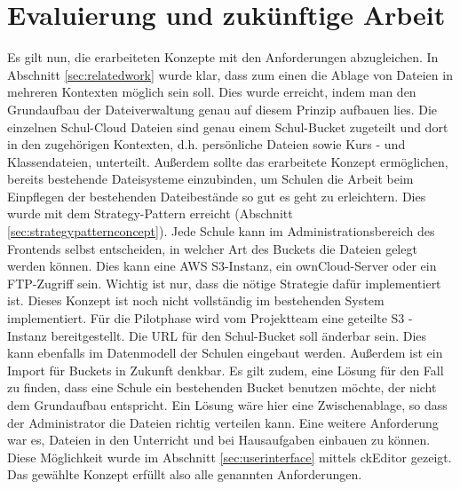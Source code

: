 \section{Evaluierung und zukünftige Arbeit}
\label{sec:evaluation}

Es gilt nun, die erarbeiteten Konzepte mit den Anforderungen abzugleichen. In Abschnitt \ref{sec:relatedwork} wurde klar, dass zum einen die Ablage von Dateien in mehreren Kontexten möglich sein soll. Dies wurde erreicht, indem man den Grundaufbau der Dateiverwaltung genau auf diesem Prinzip aufbauen lies. Die einzelnen Schul-Cloud Dateien sind genau einem Schul-Bucket zugeteilt und dort in den zugehörigen Kontexten, d.h. persönliche Dateien sowie Kurs - und Klassendateien, unterteilt. Außerdem sollte das erarbeitete Konzept ermöglichen, bereits bestehende Dateisysteme einzubinden, um Schulen die Arbeit beim Einpflegen der bestehenden Dateibestände so gut es geht zu erleichtern. Dies wurde mit dem Strategy-Pattern erreicht (Abschnitt \ref{sec:strategypatternconcept}). Jede Schule kann im Administrationsbereich des Frontends selbst entscheiden, in welcher Art des Buckets die Dateien gelegt werden können. Dies kann eine AWS S3-Instanz, ein ownCloud-Server oder ein FTP-Zugriff sein. Wichtig ist nur, dass die nötige Strategie dafür implementiert ist. Dieses Konzept ist noch nicht vollständig im bestehenden System implementiert. Für die Pilotphase wird vom Projektteam eine geteilte S3 - Instanz bereitgestellt. Die URL für den Schul-Bucket soll änderbar sein. Dies kann ebenfalls im Datenmodell der Schulen eingebaut werden. Außerdem ist ein Import für Buckets in Zukunft denkbar.  Es gilt zudem, eine Lösung für den Fall zu finden, dass eine Schule ein bestehenden Bucket benutzen möchte, der nicht dem Grundaufbau entspricht. Ein Lösung wäre hier eine Zwischenablage, so dass der Administrator die Dateien richtig verteilen kann. Eine weitere Anforderung war es, Dateien in den Unterricht und bei Hausaufgaben einbauen zu können. Diese Möglichkeit wurde im Abschnitt \ref{sec:userinterface} mittels ckEditor gezeigt. Das gewählte Konzept erfüllt also alle genannten Anforderungen.

